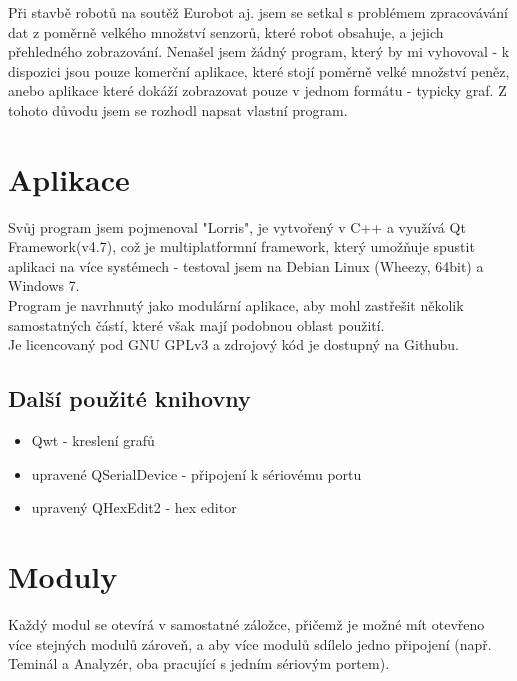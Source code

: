 \documentclass[12pt, a4paper, oneside]{article}
\begin{document}
Při stavbě robotů na soutěž Eurobot aj. jsem se setkal s problémem zpracovávání dat z poměrně velkého množství senzorů, které robot obsahuje, a jejich přehledného zobrazování. Nenašel jsem žádný program, který by mi vyhovoval - k dispozici jsou pouze komerční aplikace, které stojí poměrně velké množství peněz, anebo aplikace které dokáží zobrazovat pouze v jednom formátu - typicky graf. Z tohoto důvodu jsem se rozhodl napsat vlastní program.

\section*{Aplikace}
Svůj program jsem pojmenoval "Lorris", je vytvořený v C++ a využívá Qt Framework(v4.7)\cite{qtfw}, což je multiplatformní framework, který umožňuje spustit aplikaci na více systémech - testoval jsem na Debian Linux (Wheezy, 64bit) a Windows 7. \\
Program je navrhnutý jako modulární aplikace, aby mohl zastřešit několik samostatných částí, které však mají podobnou oblast použití. \\
Je licencovaný pod GNU GPLv3 a zdrojový kód je dostupný na Githubu\cite{repo}.
\subsection*{Další použité knihovny}
    \begin{itemize}
        \item Qwt - kreslení grafů
        \item upravené QSerialDevice - připojení k sériovému portu
        \item upravený QHexEdit2 - hex editor 
    \end{itemize}

\newpage
\setlength{\voffset}{0mm} %
\pagestyle{plain}

\section*{Moduly}
Každý modul se otevírá v samostatné záložce, přičemž je možné mít otevřeno více stejných modulů zároveň, a aby více modulů sdílelo jedno připojení (např. Teminál a Analyzér, oba pracující s jedním sériovým portem).
\end{document}
